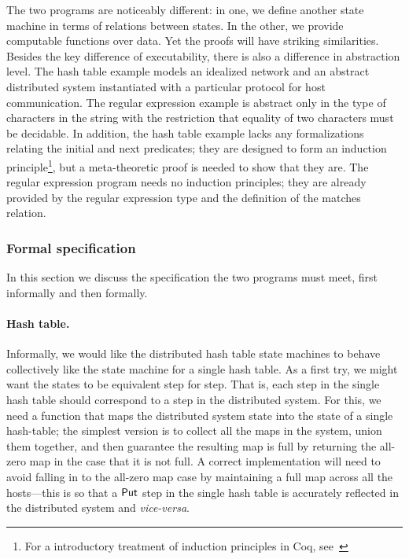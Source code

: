 The two programs are noticeably different: in one, we define another
state machine in terms of relations between states. In the other, we provide
computable functions over data. Yet the proofs will have striking similarities.
Besides the key difference of executability, there is also a difference in
abstraction level. The hash table example models an idealized network and an
abstract distributed system instantiated with a particular protocol for host
communication. The regular expression example is abstract only in the type of
characters in the string with the restriction that equality of two characters
must be decidable. In addition, the hash table example lacks any formalizations
relating the initial and next predicates; they are designed to form an induction
principle\footnote{For a introductory treatment of induction principles in Coq,
see~\cite[Induction Principles]{Pierce:SF1}}, but a meta-theoretic proof is
needed to show that they are. The regular expression program needs no induction
principles; they are already provided by the regular expression type and the
definition of the matches relation.

\subsubsection{Formal specification}\label{S:ex_spec}

In this section we discuss the specification the two programs must meet, first
informally and then formally.

\paragraph{Hash table.} Informally, we would like the distributed hash table
state machines to behave collectively like the state machine for a single hash
table. As a first try, we might want the states to be equivalent step for step.
That is, each step in the single hash table should correspond to a step in the
distributed system. For this, we need a function that maps the distributed
system state into the state of a single hash-table; the simplest version is to
collect all the maps in the system, union them together, and then guarantee the
resulting map is full by returning the all-zero map in the case that it is not
full. A correct implementation will need to avoid falling in to the all-zero map
case by maintaining a full map across all the hosts---this is so that a
\(\mathsf{Put}\) step in the single hash table is accurately reflected in the
distributed system and \emph{vice-versa}.

